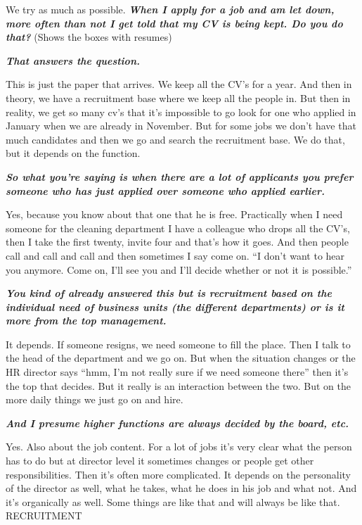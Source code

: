 \documentclass[a4paper,fleqn,11pt,dvips,titlepage]{article}
\newcommand{\question}[1]{\textbf{\textit{#1}}}
\numberwithin{figure}{section}
\numberwithin{equation}{section}
\begin{document}
 We try as much as possible. 
 \question{ When I apply for a job and am let down, more often than not I get told that my CV is being kept. Do you do that? }
(Shows the boxes with resumes) 

\question{That answers the question.}

This is just the paper that arrives. We keep all the CV’s for a year. And then in theory, we have a recruitment base where we keep all the people in. But then in reality, we get so many cv’s that it’s impossible to go look for one who applied in January when we are already in November. But for some jobs we don’t have that much candidates and then we go and search the recruitment base. We do that, but it depends on the function. 

\question{So what you’re saying is when there are a lot of applicants you prefer someone who has just applied over someone who applied earlier. }

Yes, because you know about that one that he is free. Practically when I need someone for the cleaning department I have a colleague who drops all the CV’s, then I take the first twenty, invite four and that’s how it goes. And then people call and call and call and then sometimes I say come on. “I don’t want to hear you anymore. Come on, I’ll see you and I’ll decide whether or not it is possible.”

\question{You kind of already answered this but is recruitment based on the individual need of business units (the different departments) or is it more from the top management.}

It depends. If someone resigns, we need someone to fill the place. Then I talk to the head of the department and we go on. But when the situation changes or the HR director says “hmm, I’m not really sure if we need someone there” then it’s the top that decides. But it really is an interaction between the two. But on the more daily things we just go on and hire. 

\question{And I presume higher functions are always decided by the board, etc. }

Yes. Also about the job content. For a lot of jobs it’s very clear what the person has to do but at director level it sometimes changes or people get other responsibilities. Then it’s often more complicated. It depends on the personality of the director as well, what he takes, what he does in his job and what not. And it’s organically as well. Some things are like that and will always be like that.
RECRUITMENT
\end{document}
